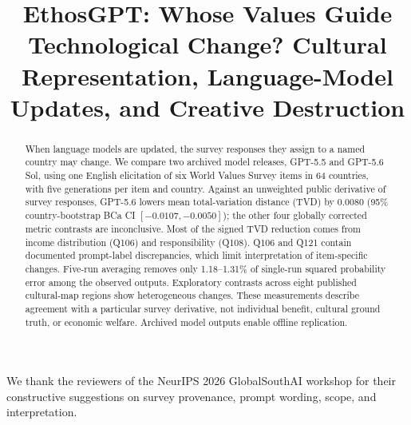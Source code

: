 \documentclass{article}
\title{EthosGPT: Whose Values Guide Technological Change? Cultural Representation, Language-Model Updates, and Creative Destruction}
\begin{document}
\maketitle

\begin{abstract}
When language models are updated, the survey responses they assign to a named
country may change. We compare two archived model releases, GPT-5.5 and GPT-5.6
Sol, using one English elicitation of six World Values Survey items in 64
countries, with five generations per item and country. Against an unweighted
public derivative of survey responses, GPT-5.6 lowers mean total-variation
distance (TVD) by $0.0080$ (95\% country-bootstrap BCa CI
$[-0.0107,-0.0050]$); the other four globally corrected metric contrasts are
inconclusive. Most of the signed TVD reduction comes from income distribution
(Q106) and responsibility (Q108). Q106 and Q121 contain documented prompt-label
discrepancies, which limit interpretation of item-specific changes. Five-run
averaging removes only 1.18--1.31\% of single-run squared probability error
among the observed outputs. Exploratory contrasts across eight published cultural-map regions show
heterogeneous changes. These measurements describe agreement with a
particular survey derivative, not individual benefit, cultural ground truth,
or economic welfare. Archived model outputs enable offline replication.
\end{abstract}





\begin{ack}
We thank the reviewers of the NeurIPS 2026 GlobalSouthAI workshop for their
constructive suggestions on survey provenance, prompt wording, scope, and
interpretation.
\end{ack}
\clearpage



\clearpage

\appendix














\end{document}

